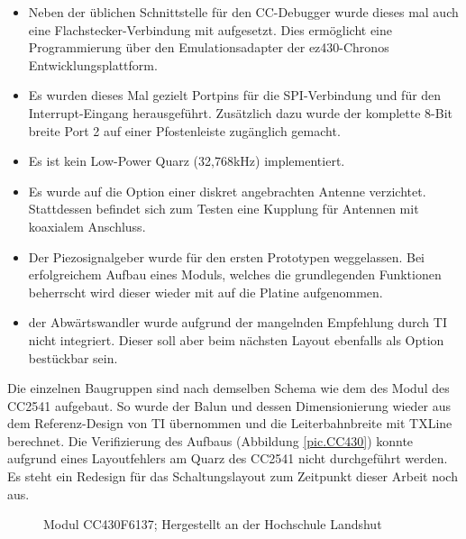 \documentclass[12pt]{scrreprt} %
\begin{document}
\begin{itemize}
\item
Neben der üblichen Schnittstelle für den CC-Debugger wurde dieses mal auch eine Flachstecker-Verbindung mit aufgesetzt. Dies ermöglicht eine Programmierung über den Emulationsadapter der ez430-Chronos Entwicklungsplattform.
\item
Es wurden dieses Mal gezielt Portpins für die SPI-Verbindung und für den Interrupt-Eingang herausgeführt. Zusätzlich dazu wurde der komplette 8-Bit breite Port 2 auf einer Pfostenleiste zugänglich gemacht.
\item
Es ist kein Low-Power Quarz (32,768kHz) implementiert.
\item
Es wurde auf die Option einer diskret angebrachten Antenne verzichtet. Stattdessen befindet sich zum Testen eine Kupplung für Antennen mit koaxialem Anschluss.
\item
Der Piezosignalgeber wurde für den ersten Prototypen weggelassen. Bei erfolgreichem Aufbau eines Moduls, welches die grundlegenden Funktionen beherrscht wird dieser wieder mit auf die Platine aufgenommen.
\item
der Abwärtswandler wurde aufgrund der mangelnden Empfehlung durch TI nicht integriert. Dieser soll aber beim nächsten Layout ebenfalls als Option bestückbar sein.
\end{itemize}
Die einzelnen Baugruppen sind nach demselben Schema wie dem des Modul des CC2541 aufgebaut. So wurde der Balun und dessen Dimensionierung wieder aus dem Referenz-Design von TI übernommen und die Leiterbahnbreite mit TXLine berechnet. 
Die Verifizierung des Aufbaus (Abbildung \vref{pic.CC430}) konnte aufgrund eines Layoutfehlers am Quarz des CC2541 nicht durchgeführt werden. Es steht ein Redesign für das Schaltungslayout zum Zeitpunkt dieser Arbeit noch aus. 
\begin{figure}
\centering
{}
\caption{Modul CC430F6137; Hergestellt an der Hochschule Landshut}
\label{pic.CC430}
\end{figure}
\end{document}
